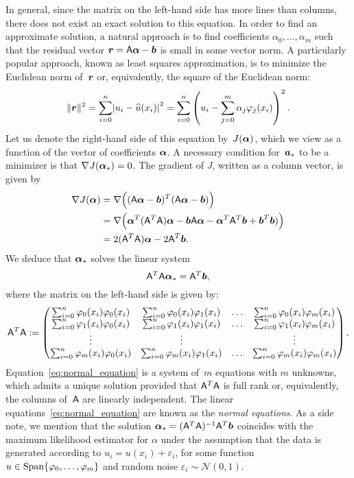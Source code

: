 In general,
since the matrix on the left-hand side has more lines than columns,
there does not exist an exact solution to this equation.
In order to find an approximate solution,
a natural approach is to find coefficients $\alpha_0, \dotsc, \alpha_m$ such that
the residual vector $\mathbf{\boldsymbol{r}} = \mathsf A \mathbf{\boldsymbol{\alpha}} - \mathbf{\boldsymbol{b}}$ is small in some vector norm.
A particularly popular approach,
known as least squares approximation,
is to minimize the Euclidean norm of~$\mathbf{\boldsymbol{r}}$ or,
equivalently, the square of the Euclidean norm:
\[
    \norm{\vect r}^2 = \sum_{i=0}^{n} \abs[big]{u_i - \widehat u(x_i)}^2 = \sum_{i=0}^{n} \left( u_i - \sum_{j=0}^{m} \alpha_j \varphi_j(x_i) \right)^2.
\]
Let us denote the right-hand side of this equation by~$J(\mathbf{\boldsymbol{\alpha}})$,
which we view as a function of the vector of coefficients $\mathbf{\boldsymbol{\alpha}}$.
A necessary condition for~$\mathbf{\boldsymbol{a}}_*$ to be a minimizer is that $\nabla J(\mathbf{\boldsymbol{\alpha}}_*) = 0$.
The gradient of $J$,
written as a column vector, is given by
\begin{align*}
    \nabla J(\mathbf{\boldsymbol{\alpha}})
    &= \nabla \Bigl( (\mathsf A \mathbf{\boldsymbol{\alpha}} - \mathbf{\boldsymbol{b}})^T (\mathsf A \mathbf{\boldsymbol{\alpha}} - \mathbf{\boldsymbol{b}}) \Bigr) \\
    &= \nabla \Bigl( \mathbf{\boldsymbol{\alpha}}^T (\mathsf A^T \mathsf A) \mathbf{\boldsymbol{\alpha}} - \mathbf{\boldsymbol{b}} \mathsf A  \mathbf{\boldsymbol{\alpha}} - \mathbf{\boldsymbol{\alpha}}^T \mathsf A^T \mathbf{\boldsymbol{b}} + \mathbf{\boldsymbol{b}}^T \mathbf{\boldsymbol{b}}) \Bigr) \\
    &= 2 (\mathsf A^T \mathsf A) \mathbf{\boldsymbol{\alpha}} - 2 \mathsf A^T \mathbf{\boldsymbol{b}}.
\end{align*}
We deduce that $\mathbf{\boldsymbol{\alpha}}_*$ solves the linear system
\begin{equation}
    \label{eq:normal_equation}
    \mathsf A^T \mathsf A \mathbf{\boldsymbol{\alpha}}_* = \mathsf A^T \mathbf{\boldsymbol{b}},
\end{equation}
where the matrix on the left-hand side is given by:
\[
    \mathsf A^T \mathsf A :=
    \begin{pmatrix}
        \sum_{i=0}^{n} \varphi_0(x_i) \varphi_0(x_i) & \sum_{i=0}^{n} \varphi_0(x_i) \varphi_1(x_i) & \hdots & \sum_{i=0}^{n} \varphi_0(x_i) \varphi_m(x_i) \\
        \sum_{i=0}^{n} \varphi_1(x_i) \varphi_0(x_i) & \sum_{i=0}^{n} \varphi_1(x_i) \varphi_1(x_i) & \hdots & \sum_{i=0}^{n} \varphi_1(x_i) \varphi_m(x_i) \\
        \vdots & \vdots & & \vdots \\
        \sum_{i=0}^{n} \varphi_m(x_i) \varphi_0(x_i) & \sum_{i=0}^{n} \varphi_m(x_i) \varphi_1(x_i) & \hdots & \sum_{i=0}^{n} \varphi_m(x_i) \varphi_m(x_i)
    \end{pmatrix}.
\]
Equation~\eqref{eq:normal_equation} is a system of~$m$ equations with $m$ unknowns,
which admits a unique solution provided that $\mathsf A^T \mathsf A$ is full rank or,
equivalently, the columns of~$\mathsf A$ are linearly independent.
The linear equations~\eqref{eq:normal_equation} are known as the \emph{normal equations}.
As a side note,
we mention that
the solution $\mathbf{\boldsymbol{\alpha}}_* = (\mathsf A^T \mathsf A)^{-1} \mathsf A^T \mathbf{\boldsymbol{b}}$
coincides with the maximum likelihood estimator for $\alpha$ under the assumption that the data is generated according to
$u_i = u(x_i) + \varepsilon_i$, for some function $u \in \operatorname{Span} \{\varphi_0, \dotsc, \varphi_m\}$
and random noise $\varepsilon_i \sim \mathcal N(0, 1)$.

